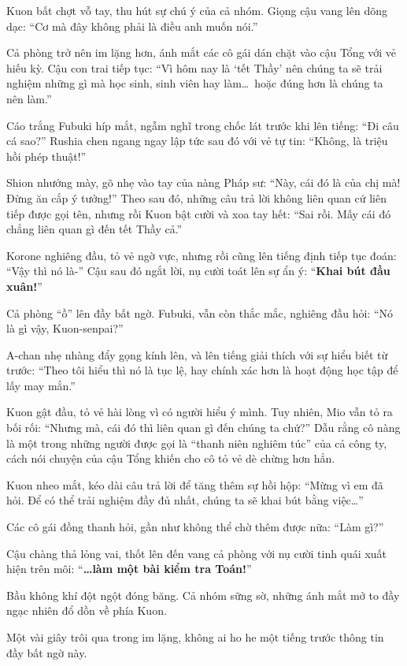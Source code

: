 \documentclass[../main.tex]{subfiles}
\begin{document}
Kuon bất chợt vỗ tay, thu hút sự chú ý của cả nhóm. Giọng cậu vang lên dõng dạc: ``Cơ mà đây không phải là điều anh muốn nói.''

Cả phòng trở nên im lặng hơn, ánh mắt các cô gái dán chặt vào cậu Tổng với vẻ hiếu kỳ. Cậu con trai tiếp tục: ``Vì hôm nay là `tết Thầy' nên chúng ta sẽ trải nghiệm những gì mà học sinh, sinh viên hay làm\dots\ hoặc đúng hơn là chúng ta nên làm.''

Cáo trắng Fubuki híp mắt, ngẫm nghĩ trong chốc lát trước khi lên tiếng: ``Đi câu cá sao?'' Rushia chen ngang ngay lập tức sau đó với vẻ tự tin: ``Không, là triệu hồi phép thuật!''

Shion nhướng mày, gõ nhẹ vào tay của nàng Pháp sư: ``Này, cái đó là của chị mà! Đừng ăn cắp ý tưởng!'' Theo sau đó, những câu trả lời không liên quan cứ liên tiếp được gọi tên, nhưng rồi Kuon bật cười và xoa tay hết: ``Sai rồi. Mấy cái đó chẳng liên quan gì đến tết Thầy cả.''

Korone nghiêng đầu, tỏ vẻ ngờ vực, nhưng rồi cũng lên tiếng định tiếp tục đoán: ``Vậy thì nó là-'' Cậu sau đó ngắt lời, nụ cười toát lên sự ẩn ý: ``\textbf{Khai bút đầu xuân!}''

Cả phòng ``ồ'' lên đầy bất ngờ. Fubuki, vẫn còn thắc mắc, nghiêng đầu hỏi: ``Nó là gì vậy, Kuon-senpai?''

A-chan nhẹ nhàng đẩy gọng kính lên, và lên tiếng giải thích với sự hiểu biết từ trước: ``Theo tôi hiểu thì nó là tục lệ, hay chính xác hơn là hoạt động học tập để lấy may mắn.''

Kuon gật đầu, tỏ vẻ hài lòng vì có người hiểu ý mình. Tuy nhiên, Mio vẫn tỏ ra bối rối: ``Nhưng mà, cái đó thì liên quan gì đến chúng ta chứ?'' Dẫu rằng cô nàng là một trong những người được gọi là ``thanh niên nghiêm túc'' của cả công ty, cách nói chuyện của cậu Tổng khiến cho cô tỏ vẻ dè chừng hơn hẳn.

Kuon nheo mắt, kéo dài câu trả lời để tăng thêm sự hồi hộp: ``Mừng vì em đã hỏi. Để có thể trải nghiệm đầy đủ nhất, chúng ta sẽ khai bút bằng việc\dots''

Các cô gái đồng thanh hỏi, gần như không thể chờ thêm được nữa: ``Làm gì?''

Cậu chàng thả lỏng vai, thốt lên đến vang cả phòng với nụ cười tinh quái xuất hiện trên môi: ``\textbf{\dots làm một bài kiểm tra Toán!}''

Bầu không khí đột ngột đóng băng. Cả nhóm sững sờ, những ánh mắt mở to đầy ngạc nhiên đổ dồn về phía Kuon.

Một vài giây trôi qua trong im lặng, không ai ho he một tiếng trước thông tin đầy bất ngờ này.
\end{document}
